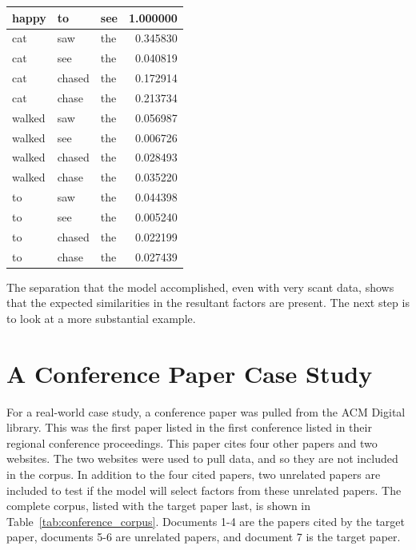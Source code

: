 \documentclass[../ut-dissertation.tex]{subfiles}
\begin{document}
\begin{table}[p]
\begin{tabular}{|lll|r|}
    \hline
    happy & to & see & 1.000000\\
    \hline
    cat & saw & the & 0.345830\\
    cat & see & the & 0.040819\\
    cat & chased & the & 0.172914\\
    cat & chase & the & 0.213734\\
    walked & saw & the & 0.056987\\
    walked & see & the & 0.006726\\
    walked & chased & the & 0.028493\\
    walked & chase & the & 0.035220\\
    to & saw & the & 0.044398\\
    to & see & the & 0.005240\\
    to & chased & the & 0.022199\\
    to & chase & the & 0.027439\\
    \hline
  \end{tabular}
\end{table}

The separation that the model accomplished, even with very scant data,
shows that the expected similarities in the resultant factors are
present.  The next step is to look at a more substantial example.
\FloatBarrier

\section{A Conference Paper Case Study}
For a real-world case study, a conference paper was pulled from the
ACM Digital library.  This was the first paper listed in the first
conference listed in their regional conference proceedings.  This
paper cites four other papers and two websites.  The two websites were
used to pull data, and so they are not included in the corpus.  In
addition to the four cited papers, two unrelated papers are included
to test if the model will select factors from these unrelated papers.
The complete corpus, listed with the target paper last, is shown in
Table~\ref{tab:conference_corpus}. Documents 1-4 are the papers cited
by the target paper, documents 5-6 are unrelated papers, and document
7 is the target paper.
\end{document}
